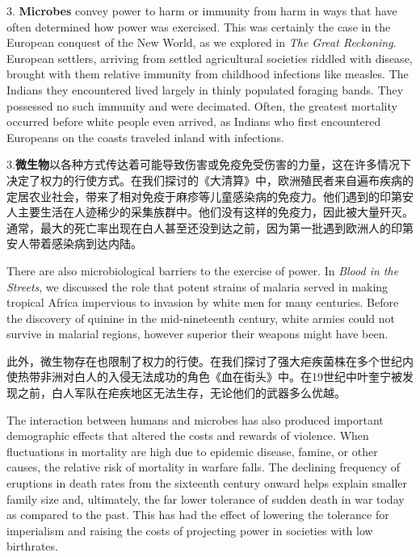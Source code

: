 \begin{Parallel}{97mm}{72mm}
  \ParallelLText
  {3. \textbf{Microbes} convey power to harm or immunity from harm in ways that have often determined how power was exercised. This was certainly the case in the European conquest of the New World, as we explored in \emph{The Great Reckoning}. European settlers, arriving from settled agricultural societies riddled with disease, brought with them relative immunity from childhood infections like measles. The Indians they encountered lived largely in thinly populated foraging bands. They possessed no such immunity and were decimated. Often, the greatest mortality occurred before white people even arrived, as Indians who first encountered Europeans on the coasts traveled inland with infections.}
  
  \ParallelRText
  {3.\textbf{微生物}以各种方式传达着可能导致伤害或免疫免受伤害的力量，这在许多情况下决定了权力的行使方式。在我们探讨的《大清算》中，欧洲殖民者来自遍布疾病的定居农业社会，带来了相对免疫于麻疹等儿童感染病的免疫力。他们遇到的印第安人主要生活在人迹稀少的采集族群中。他们没有这样的免疫力，因此被大量歼灭。通常，最大的死亡率出现在白人甚至还没到达之前，因为第一批遇到欧洲人的印第安人带着感染病到达内陆。}
  \ParallelPar



  \ParallelLText
  {There are also microbiological barriers to the exercise of power. In \emph{Blood in the Streets}, we discussed the role that potent strains of malaria served in making tropical Africa impervious to invasion by white men for many centuries. Before the discovery of quinine in the mid-nineteenth century, white armies could not survive in malarial regions, however superior their weapons might have been.}
  
  \ParallelRText
  {此外，微生物存在也限制了权力的行使。在我们探讨了强大疟疾菌株在多个世纪内使热带非洲对白人的入侵无法成功的角色《血在街头》中。在19世纪中叶奎宁被发现之前，白人军队在疟疾地区无法生存，无论他们的武器多么优越。}
  \ParallelPar



  \ParallelLText
  {The interaction between humans and microbes has also produced important demographic effects that altered the costs and rewards of violence. When fluctuations in mortality are high due to epidemic disease, famine, or other causes, the relative risk of mortality in warfare falls. The declining frequency of eruptions in death rates from the sixteenth century onward helps explain smaller family size and, ultimately, the far lower tolerance of sudden death in war today as compared to the past. This has had the effect of lowering the tolerance for imperialism and raising the costs of projecting power in societies with low birthrates.}
  

\end{Parallel}
